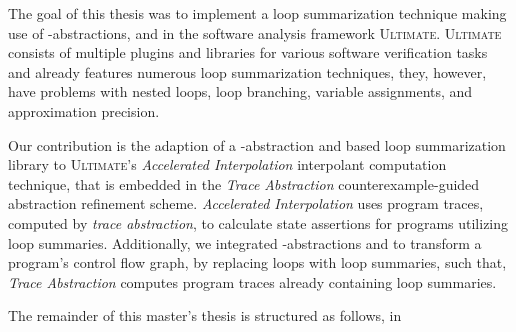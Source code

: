 The goal of this thesis was to implement a loop summarization technique making use of \qvasr-abstractions, and \qvasrs in the software analysis framework \textsc{Ultimate}\cite{Zitat02}.
\textsc{Ultimate} consists of multiple plugins and libraries for various software verification tasks and already features numerous loop summarization techniques, they, however, have problems with nested loops, loop branching, variable assignments, and approximation precision.\\  \par
Our contribution is the adaption of a \qvasr-abstraction and \qvasrs based loop summarization library to \textsc{Ultimate}'s \textsl{Accelerated Interpolation} interpolant computation technique, that is embedded in the \textsl{Trace Abstraction} \cite{10.1007/978-3-642-03237-0_7} counterexample-guided abstraction refinement scheme. \textsl{Accelerated Interpolation} uses program traces, computed by \textsl{trace abstraction}, to calculate state assertions for programs utilizing loop summaries. Additionally, we integrated \qvasr-abstractions and \qvasrs to transform a program's control flow graph, by replacing loops with loop summaries, such that, \textsl{Trace Abstraction} computes program traces already containing loop summaries.\\ \par

The remainder of this master's thesis is structured as follows, in \

